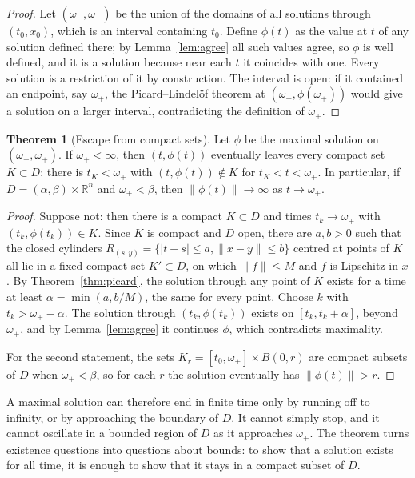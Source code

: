 \documentclass[11pt,a4paper]{article}
\numberwithin{equation}{section}
\theoremstyle{definition}
\newtheorem{thm}{Theorem}[subsection]
\begin{document}
\begin{proof}
Let $(\omega_-, \omega_+)$ be the union of the domains of all solutions through $(t_0, x_0)$, which is an interval containing $t_0$. Define $\phi(t)$ as the value at $t$ of any solution
defined there; by Lemma~\ref{lem:agree} all such values agree, so $\phi$ is well defined, and it is a solution because near each $t$ it coincides with one. Every solution is
a restriction of it by construction. The interval is open: if it contained an endpoint, say $\omega_+$, the Picard--Lindel\"of theorem at $(\omega_+, \phi(\omega_+))$ would give a solution
on a larger interval, contradicting the definition of $\omega_+$.
\end{proof}

\begin{thm}[Escape from compact sets]
\label{thm:escape}
Let $\phi$ be the maximal solution on $(\omega_-, \omega_+)$. If $\omega_+ < \infty$, then $(t, \phi(t))$ eventually leaves every compact set $K \subset D$: there is $t_K < \omega_+$ with $(t, \phi(t)) \notin K$
for $t_K < t < \omega_+$. In particular, if $D = (\alpha, \beta) \times \mathbb R^n$ and $\omega_+ < \beta$, then $\|\phi(t)\| \to \infty$ as $t \to \omega_+$.
\end{thm}

\begin{proof}
Suppose not: then there is a compact $K \subset D$ and times $t_k \to \omega_+$ with $(t_k, \phi(t_k)) \in K$. Since $K$ is compact and $D$ open, there are $a, b > 0$ such that the closed
cylinders $R_{(s, y)} = \{|t - s| \leq a, \|x - y\| \leq b\}$ centred at points of $K$ all lie in a fixed compact set $K' \subset D$, on which $\|f\| \leq M$ and $f$ is Lipschitz in $x$. By
Theorem~\ref{thm:picard}, the solution through any point of $K$ exists for a time at least $\alpha = \min(a, b/M)$, the same for every point. Choose $k$ with $t_k > \omega_+ - \alpha$. The solution through
$(t_k, \phi(t_k))$ exists on $[t_k, t_k + \alpha]$, beyond $\omega_+$, and by Lemma~\ref{lem:agree} it continues $\phi$, which contradicts maximality.

For the second statement, the sets $K_r = [t_0, \omega_+] \times \bar B(0, r)$ are compact subsets of $D$ when $\omega_+ < \beta$, so for each $r$ the solution eventually has $\|\phi(t)\| > r$.
\end{proof}

A maximal solution can therefore end in finite time only by running off to infinity, or by approaching the boundary of $D$. It cannot simply stop, and it
cannot oscillate in a bounded region of $D$ as it approaches $\omega_+$. The theorem turns existence questions into questions about bounds: to show that a solution
exists for all time, it is enough to show that it stays in a compact subset of $D$.
\end{document}
